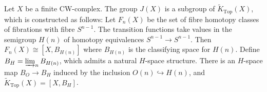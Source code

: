 Let $X$ be a finite CW-complex. The group $J(X)$ is a subgroup of $\widetilde{K}_{\text{Top}}(X)$, which is constructed as follows: Let $F_n(X)$ be the set of fibre homotopy classes of fibrations with fibre $S^{n-1}$. The transition functions take values in the semigroup $H(n)$ of homotopy equivalences $S^{n-1} \to S^{n-1}$. Then $F_n(X) \cong [X, B_{H(n)}]$ where $B_{H(n)}$ is the classifying space for $H(n)$. Define $B_H = \varinjlim_n B_{H(n)}$, which admits a natural $H$-space structure. There is an $H$-space map $B_O \to B_H$ induced by the inclusion $O(n) \hookrightarrow H(n)$, and $\widetilde{K}_{\text{Top}}(X) = [X, B_H]$.
